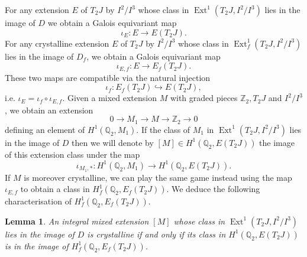 \documentclass[11pt]{amsart}
\def\Z{\mathbb Z}
\def\Q{\mathbb Q}
\theoremstyle{plain}
\newtheorem{lemma}{Lemma}
\theoremstyle{definition}
\newcommand{\cris}{\mathrm{cris}}
\DeclareMathOperator{\ext}{Ext}
\begin{document}
For any extension $E$ of $T_2 J$ by $I^2 /I^3 $ whose class in $\ext ^1 (T_2 J,I^2 /I^3 )$ lies in the image of $D$ we obtain a Galois equivariant map
\[
\iota _E  :E\to E(T_2 J).
\]
For any crystalline extension $E$ of $T_2 J$ by $I^2 /I^3 $ whose class in $\ext ^1 _f (T_2 J,I^2 /I^3 )$ lies in the image of $D_f$, we obtain a Galois equivariant map
\[
\iota _{E,f}:E\to E_f (T_2 J).
\]
These two maps are compatible via the natural injection
\[
\iota _f :E_f (T_2 J)\hookrightarrow E(T_2 J),
\]
 i.e. $\iota _E = \iota _f \circ \iota _{E,f}$. Given a mixed extension $M$ with graded pieces $\Z _2 ,T_2 J $ and $I^2 /I^3$, we obtain an extension
\[
0\to M_1 \to M\to \Z _2 \to 0
\]
defining an element of $H^1 (\Q _2 ,M_1 )$. If the class of $M_1 $ in $\ext ^1 (T_2 J,I^2 /I^3 )$ lies in the image of $D$ then we will denote by $[M]\in H^1 (\Q _2 ,E(T_2 J))$ the image of this extension class under the map
\[
\iota _{M_1 ,*}:H^1 (\Q _2 ,M_1 )\to H^1 (\Q _2 ,E(T_2 J)).
\]
If $M$ is moreover crystalline, we can play the same game instead using the map $\iota _{E,f}$ to obtain a class in $H^1 _f (\Q _2 ,E_f (T_2 J))$. We deduce the following characterisation of $H^1 _f (\Q _2 ,E_f (T_2 J))$.
\begin{lemma}\label{lemma:cris1}
An integral mixed extension $[M]$ whose class in $\ext ^1 (T_2 J,I^2 /I^3 )$ lies in the image of $D$ is crystalline if and only if its class in $H^1 (\Q _2 ,E (T_2 J))$ is in the image of $H^1 _f (\Q _2 ,E_f (T_2 J))$.
\end{lemma}
\end{document}
